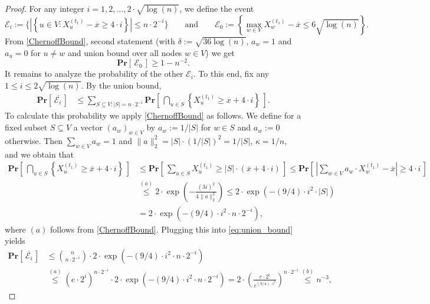 \documentclass[10pt,a4paper]{amsart}
\newcommand{\Pro}[1]{\mathbf{Pr} \left[\,#1\,\right]}
\begin{document}
\begin{proof}
For any integer $i=1,2,\ldots,2\cdot \sqrt{\log(n)} $, we define the event
\[
\mathcal{E}_i := \biggl\{ \left| \left\{ u \in V \colon X_u^{(t_1)} - \overline{x} \geq 4\cdot i \right\} \right| \le n \cdot 2^{-i} \biggr\} \qquad \text{and} \qquad \mathcal{E}_0 := \left\{  \max_{w\in V}X_{w}^{(t_1)} -\overline{x} \le 6 \sqrt{\log(n)} \right \}.
\]
From \cref{ChernoffBound}, second statement (with $\delta:=\sqrt{36\log(n)}$, $a_w=1$ and $a_u=0$ for $u\neq w$ and union bound over all nodes $w\in V$) we get
\[
\Pro{ \mathcal{E}_0 } \geq 1 - n^{-2}.
\] 
It remains to analyze the probability of the other $\mathcal{E}_i$. To this end, fix any $1 \leq i \leq 2\sqrt{\log(n)} $. By the union bound,
\begin{align}
\Pro{ \overline{\mathcal{E}_i }} &\leq \sum_{S \subseteq V \colon |S| = n \cdot 2^{-i}}
\Pro{ \bigcap_{u \in S} \left\{ X_u^{(t_1)} \geq \overline{x} + 4 \cdot i \right\} }. \label{eq:union_bound}
\end{align}
To calculate this probability we apply \cref{ChernoffBound} as follows.
We define for a fixed subset $S \subseteq V$ a vector $(a_w)_{w \in V}$ by $a_w := 1/|S|$ for $w \in S$ and $a_w := 0$ otherwise. Then $\sum_{w \in V} a_w =1$ and $\|a\|_2^2 = |S| \cdot (1/|S|)^2 = 1/|S|$, $\kappa=1/n$, and we obtain that
\begin{align*}
\Pro{ \bigcap_{u \in S} \left\{ X_u^{(t_1)} \geq \overline{x} \!+\! 4 \cdot i \right\} } \!&\leq \Pro{\sum_{u \in S} X_u^{(t_1)} \geq |S| \cdot \left( \overline{x} + 4 \cdot i \right) } \leq
\Pro{ \left| \sum_{w \in V} a_w \cdot X_w^{(t_1)} - \overline{x} \right| \geq 4 \cdot i} \\
&\stackrel{(a)}{\leq} 2 \cdot \exp\left( - \frac{ (3 i)^2}{ 4 \| a \|_2^2} \right) \leq 2 \cdot \exp\left( - (9/4) \cdot  i^2 \cdot |S| \right) 
\\&= 2 \cdot \exp\left( - (9/4) \cdot  i^2 \cdot n \cdot 2^{-i} \right),
\end{align*}
where $(a)$ follows from \cref{ChernoffBound}. Plugging this into \cref{eq:union_bound} yields
\begin{align*}
\Pro {\overline{\mathcal{E}_i }} &\leq \binom{n}{n \cdot 2^{-i}} \cdot 2 \cdot \exp\left( - (9/4)\cdot  i^2 \cdot n \cdot 2^{-i} \right) \\&\stackrel{(a)}{\leq} \left( e \cdot 2^{i} \right)^{ n \cdot 2^{-i}} \cdot 2 \cdot \exp\left( - (9/4)\cdot  i^2 \cdot n \cdot 2^{-i} \right)
= 2 \cdot \left( \frac{e \cdot 2^{i}}{ e^{(9/4)\cdot i^2} } \right)^{ n \cdot 2^{-i}} \stackrel{(b)}{\leq} n^{-3},

\end{align*}
\end{proof}
\end{document}
